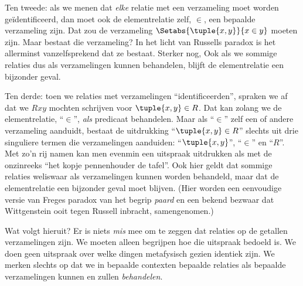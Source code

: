 \documentclass[openany]{memoir}
\begin{document}
Ten tweede: als we menen dat \emph{elke} relatie met een verzameling
moet worden geïdentificeerd, dan moet ook de elementrelatie zelf,
$\in$, een bepaalde verzameling zijn. Dat zou de verzameling
$\Setabs{\tuple{x,y}}{x \in y}$ moeten zijn. Maar bestaat die
verzameling? In het licht van Russells paradox is het allerminst
vanzelfsprekend dat ze bestaat. Sterker nog,
Ook als we sommige relaties dus als verzamelingen kunnen behandelen,
blijft de elementrelatie een bijzonder geval.

Ten derde: toen we relaties met verzamelingen ``identificeerden'',
spraken we af dat we $Rxy$ mochten schrijven voor $\tuple{x,y} \in R$.
Dat kan zolang we de elementrelatie, ``$\in$'', \emph{als} predicaat
behandelen. Maar als ``$\in$'' zelf een of andere verzameling aanduidt,
bestaat de uitdrukking ``$\tuple{x,y} \in R$'' slechts uit drie
singuliere termen die verzamelingen aanduiden: ``$\tuple{x,y}$'',
``$\in$'' en ``$R$''. Met zo'n rij namen kan men evenmin een uitspraak
uitdrukken als met de onzinreeks ``het kopje pennenhouder de tafel''.
Ook hier geldt dat sommige relaties weliswaar als verzamelingen kunnen
worden behandeld, maar dat de elementrelatie een bijzonder geval moet
blijven. (Hier worden een eenvoudige versie van Freges paradox van het
begrip \emph{paard} en een bekend bezwaar dat Wittgenstein ooit tegen
Russell inbracht, samengenomen.)

Wat volgt hieruit? Er is niets \emph{mis} mee om te zeggen dat relaties
op de getallen verzamelingen zijn. We moeten alleen begrijpen hoe die
uitspraak bedoeld is. We doen geen uitspraak over welke dingen
metafysisch gezien identiek zijn. We merken slechts op dat we in bepaalde contexten bepaalde
relaties als bepaalde verzamelingen kunnen en zullen \emph{behandelen}.
\endgroup

\begingroup
\def\olfilename{OLP-0014}
\def\olfilepath{content/sets-functions-relations/relations/}
\hypertarget{unit-OLP-0014}{}
\end{document}
